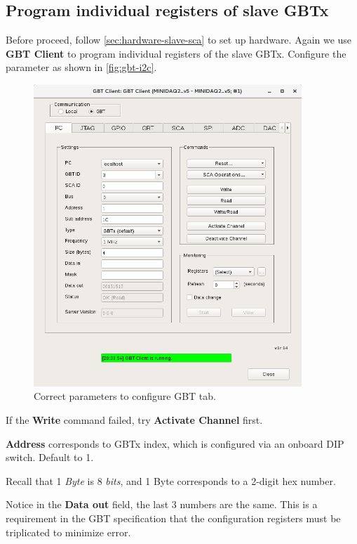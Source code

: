 \subsection{Program individual registers of slave GBTx}
\label{sec:software-slave-individual}
Before proceed, follow \autoref{sec:hardware-slave-sca} to set up hardware.
Again we use \textbf{GBT Client} to program individual registers of the slave
GBTx.
Configure the parameter as shown in \autoref{fig:gbt-i2c}.

\begin{figure}[ht]
    \centering
    \includegraphics[width=0.9\textwidth]{res/gbt_client_slave_gbt_i2c_test.png}
    \caption{Correct parameters to configure GBT \itwoc tab.}
    \label{fig:gbt-i2c}
\end{figure}

\begin{leftbar}
    If the \textbf{Write} command failed, try \textbf{Activate Channel} first.
\end{leftbar}

\begin{leftbar}
    \textbf{Address} corresponds to GBTx index, which is configured via an
    onboard DIP switch. Default to 1.
\end{leftbar}

\begin{leftbar}
    Recall that 1 \emph{Byte} is 8 \emph{bits}, and 1 Byte corresponds to a
    2-digit hex number.
\end{leftbar}

\begin{leftbar}
    Notice in the \textbf{Data out} field, the last 3 numbers are the same.
    This is a requirement in the GBT specification that the configuration
    registers must be triplicated to minimize error.
\end{leftbar}
